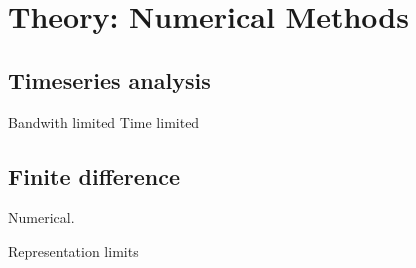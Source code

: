\newpage
\section{Theory: Numerical Methods}  \label{S:THEORY_NUMERICAL} 


 \subsection{Timeseries analysis}
 Bandwith limited
 Time limited
 
  
 
 
 \subsection{Finite difference \OGCM}

Numerical.

Representation limits




